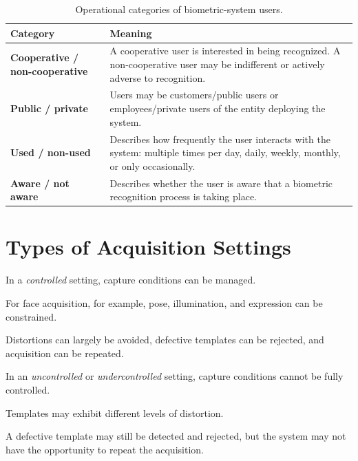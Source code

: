 \documentclass[11pt,a4paper,oneside]{report}
\begin{document}
\begin{table}[htbp]
\centering
\caption{Operational categories of biometric-system users.}
\label{tab:user-types}
\small

\begin{tabular}{
    >{\bfseries}P{3.6cm}
    P{10.3cm}
}
\toprule

Category &
\textbf{Meaning}
\\

\midrule

Cooperative / non-cooperative &
A cooperative user is interested in being recognized.
A non-cooperative user may be indifferent or actively adverse to
recognition.
\\

Public / private &
Users may be customers/public users or employees/private users of the
entity deploying the system.
\\

Used / non-used &
Describes how frequently the user interacts with the system:
multiple times per day, daily, weekly, monthly, or only occasionally.
\\

Aware / not aware &
Describes whether the user is aware that a biometric recognition process
is taking place.
\\

\bottomrule
\end{tabular}

\end{table}

\section{Types of Acquisition Settings}
\label{subsec:settings}

In a \emph{controlled} setting, capture conditions can be managed.

For face acquisition, for example, pose, illumination, and expression can
be constrained.

Distortions can largely be avoided, defective templates can be rejected,
and acquisition can be repeated.

In an \emph{uncontrolled} or \emph{undercontrolled} setting, capture
conditions cannot be fully controlled.

Templates may exhibit different levels of distortion.

A defective template may still be detected and rejected, but the system
may not have the opportunity to repeat the acquisition.
\end{document}
